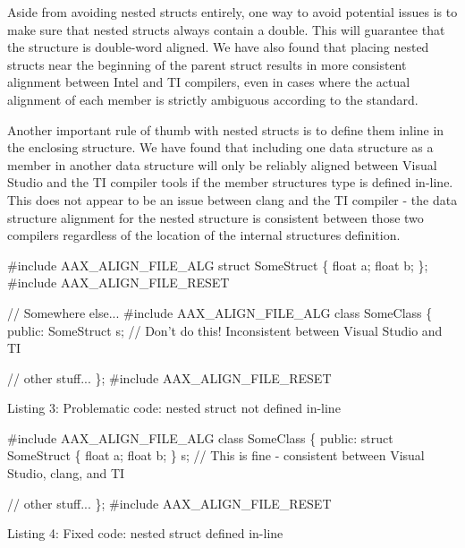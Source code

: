 Aside from avoiding nested structs entirely, one way to avoid potential issues is to make sure that nested structs always contain a double. This will guarantee that the structure is double-\/word aligned. We have also found that placing nested structs near the beginning of the parent struct results in more consistent alignment between Intel and T\+I compilers, even in cases where the actual alignment of each member is strictly ambiguous according to the standard.

Another important rule of thumb with nested structs is to define them inline in the enclosing structure. We have found that including one data structure as a member in another data structure will only be reliably aligned between Visual Studio and the T\+I compiler tools if the member structure\textquotesingle{}s type is defined in-\/line. This does not appear to be an issue between clang and the T\+I compiler -\/ the data structure alignment for the nested structure is consistent between those two compilers regardless of the location of the internal structure\textquotesingle{}s definition.


\begin{DoxyCode}
\textcolor{preprocessor}{#include AAX\_ALIGN\_FILE\_ALG}
\textcolor{keyword}{struct }SomeStruct
\{
   \textcolor{keywordtype}{float} a;
   \textcolor{keywordtype}{float} b;
\};
\textcolor{preprocessor}{#include AAX\_ALIGN\_FILE\_RESET}

\textcolor{comment}{// Somewhere else...}
\textcolor{preprocessor}{#include AAX\_ALIGN\_FILE\_ALG}
\textcolor{keyword}{class }SomeClass
\{
\textcolor{keyword}{public}:
   SomeStruct s; \textcolor{comment}{// Don't do this! Inconsistent between Visual Studio and TI}

   \textcolor{comment}{// other stuff...}
\};
\textcolor{preprocessor}{#include AAX\_ALIGN\_FILE\_RESET}
\end{DoxyCode}
  Listing 3\+: Problematic code\+: nested struct not defined in-\/line


\begin{DoxyCode}
\textcolor{preprocessor}{#include AAX\_ALIGN\_FILE\_ALG}
\textcolor{keyword}{class }SomeClass
\{
\textcolor{keyword}{public}:
   \textcolor{keyword}{struct }SomeStruct
   \{
      \textcolor{keywordtype}{float} a;
      \textcolor{keywordtype}{float} b;
   \} s; \textcolor{comment}{// This is fine - consistent between Visual Studio, clang, and TI}

   \textcolor{comment}{// other stuff...}
\};
\textcolor{preprocessor}{#include AAX\_ALIGN\_FILE\_RESET}
\end{DoxyCode}
  Listing 4\+: Fixed code\+: nested struct defined in-\/line

